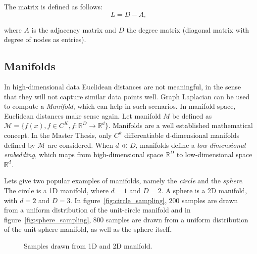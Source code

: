 The matrix is defined as follows:
\begin{equation}
    L = D - A,
\end{equation}

where $A$ is the adjacency matrix and $D$ the degree matrix (diagonal matrix with degree of nodes as entries).

\subsection{Manifolds}
\label{sec:manifolds}

In high-dimensional data Euclidean distances are not meaningful,
in the sense that they will not capture similar data points well.
Graph Laplacian can be used to compute a \textit{Manifold}, which can help in such scenarios. 
In manifold space, Euclidean distances make sense again. 
Let manifold $M$ be defined as $\mathcal{M} = \{ f(x), f \in C^K, f: \mathbb{R}^D \to \mathbb{R}^d \}$.
Manifolds are a well established mathematical concept. In the Master Thesis, only 
$C^k$ differentiable d-dimensional manifolds defined by $\mathcal{M}$ are considered. 
When $d \ll D$, manifolds define a \textit{low-dimensional embedding}, which maps from high-dimensional space 
$\mathbb{R}^D$ to low-dimensional space $\mathbb{R}^d$.

Lets give two popular examples of manifolds, namely the \textit{circle} and the \textit{sphere}.
The circle is a 1D manifold, where $d=1$ and $D=2$. A sphere is a 2D manifold, with $d=2$ and $D=3$.
In figure~\ref{fig:circle_sampling}, 200 samples are drawn from a uniform distribution of the unit-circle manifold
and in figure~\ref{fig:sphere_sampling}, 800 samples are drawn from a uniform distribution of the unit-sphere manifold,
as well as the sphere itself.

\begin{figure}[H]
    \centering
    \caption{Samples drawn from 1D and 2D manifold.}
\end{figure}


